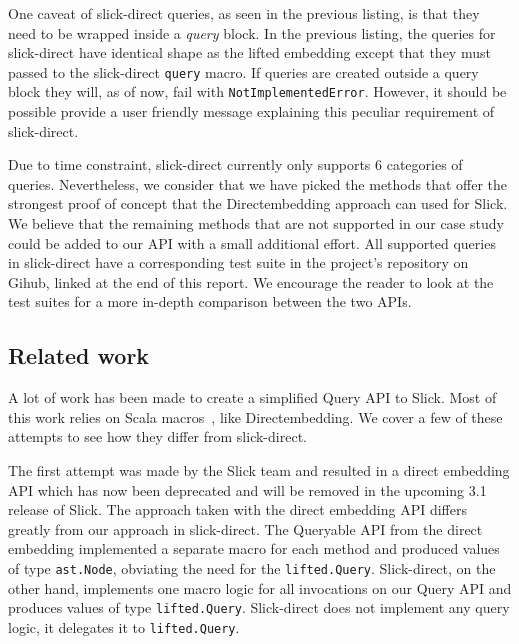 One caveat of slick-direct queries, as seen in the previous listing, is that they need to be wrapped inside a \emph{query} block.
In the previous listing, the queries for slick-direct have identical shape as the lifted embedding except that they must passed to the slick-direct \texttt{query} macro.
If queries are created outside a query block they will, as of now, fail with \texttt{NotImplementedError}.
However, it should be possible provide a user friendly message explaining this peculiar requirement of slick-direct.

Due to time constraint, slick-direct currently only supports 6 categories of queries.
Nevertheless, we consider that we have picked the methods that offer the strongest proof of concept that the Directembedding approach can used for Slick.
We believe that the remaining methods that are not supported in our case study could be added to our API with a small additional effort.
All supported queries in slick-direct have a corresponding test suite in the project's repository on Gihub, linked at the end of this report.
We encourage the reader to look at the test suites for a more in-depth comparison between the two APIs.



\subsection{Related work} %
\label{sub:Relatedwork}
A lot of work has been made to create a simplified Query API to Slick.
Most of this work relies on Scala macros~\autocite{burmako_scala_2013}, like Directembedding.
We cover a few of these attempts to see how they differ from slick-direct.

\begin{sloppypar}
The first attempt was made by the Slick team and resulted in a direct embedding API which has now been deprecated and will be removed in the upcoming 3.1 release of Slick.
The approach taken with the direct embedding API differs greatly from our approach in slick-direct.
The Queryable API from the direct embedding implemented a separate macro for each method and produced values of type \texttt{ast.Node}, obviating the need for the \texttt{lifted.Query}.
Slick-direct, on the other hand, implements one macro logic for all invocations on our Query API and produces values of type \texttt{lifted.Query}.
Slick-direct does not implement any query logic, it delegates it to \texttt{lifted.Query}.
\end{sloppypar}

